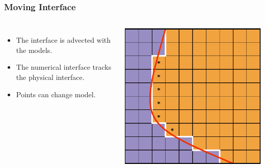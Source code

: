 \documentclass{beamer}
\begin{document}
\begin{frame}
\frametitle{Moving Interface}
\begin{columns}
\begin{itemize}
\item{The interface is advected with the models.}
\item{The numerical interface tracks the physical interface.}
\item{Points can change model.}
\end{itemize}
\includegraphics[width=\textwidth]{../images/multimodel_captured_2.pdf}
\end{columns}
\end{frame}
\end{document}
